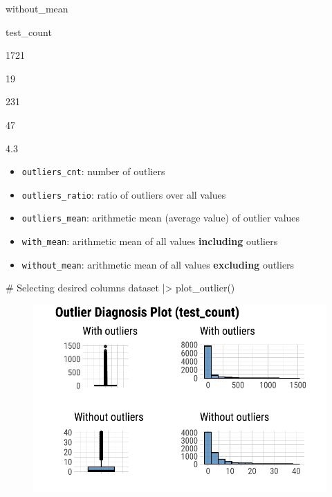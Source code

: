 \documentclass[
  letterpaper,
  DIV=11,
  numbers=noendperiod]{scrreprt}
\newenvironment{Shaded}{\begin{snugshade}}{\end{snugshade}}
\newcommand{\CommentTok}[1]{\textcolor[rgb]{0.37,0.37,0.37}{#1}}
\newcommand{\FunctionTok}[1]{\textcolor[rgb]{0.28,0.35,0.67}{#1}}
\newcommand{\NormalTok}[1]{\textcolor[rgb]{0.00,0.23,0.31}{#1}}
\newcommand{\SpecialCharTok}[1]{\textcolor[rgb]{0.37,0.37,0.37}{#1}}
\providecommand{\tightlist}{%
  \setlength{\itemsep}{0pt}\setlength{\parskip}{0pt}}\usepackage{longtable,booktabs,array}
\begin{document}
without\_mean

test\_count

1721

19

231

47

4.3

\begin{itemize}
\tightlist
\item
  \texttt{outliers\_cnt}: number of outliers
\item
  \texttt{outliers\_ratio}: ratio of outliers over all values
\item
  \texttt{outliers\_mean}: arithmetic mean (average value) of outlier
  values
\item
  \texttt{with\_mean}: arithmetic mean of all values \textbf{including}
  outliers
\item
  \texttt{without\_mean}: arithmetic mean of all values
  \textbf{excluding} outliers
\end{itemize}

\begin{Shaded}
\begin{Highlighting}[]
\CommentTok{\# Selecting desired columns }
\NormalTok{dataset }\SpecialCharTok{|\textgreater{}}
    \FunctionTok{plot\_outlier}\NormalTok{()}
\end{Highlighting}
\end{Shaded}

\begin{figure}[H]

{\centering \includegraphics{./DiagnosingLikeDataDoctor_files/figure-pdf/unnamed-chunk-6-1.pdf}

}

\end{figure}
\end{document}
